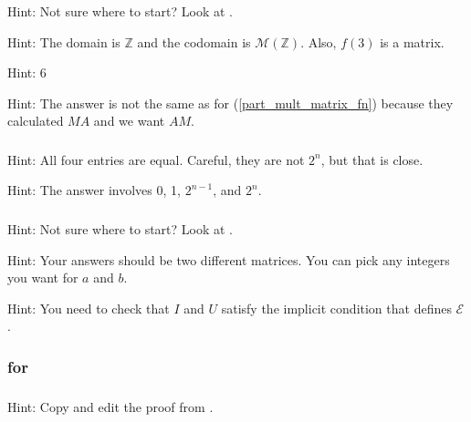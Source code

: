 \subsubsection*{ \answers}
Hint: Not sure where to start? Look at .
\begin{apart}
    \item Hint: The domain is $\mathbb{Z}$ and the codomain is $\mathscr{M}(\mathbb{Z})$.  Also, $f(3)$ is a matrix.
    \item Hint: 6
    \item Hint: The answer is not the same as for  (\ref{part_mult_matrix_fn}) because they calculated $MA$ and we want $AM$.
\end{apart}

\subsubsection*{ \answers}
\begin{apart}
    \item Hint: All four entries are equal.  Careful, they are not $2^n$, but that is close.
    \item Hint: The answer involves 0, 1, $2^{n-1}$, and $2^n$.
\end{apart}

\subsubsection*{ \answers}
Hint: Not sure where to start?  Look at .
\begin{apart}
    \item Hint: Your answers should be two different matrices.  You can pick any integers you want for $a$ and $b$.
    \item Hint: You need to check that $I$ and $U$ satisfy the implicit condition that defines $\mathscr{E}$.
\end{apart}

\subsubsection{\answers for 
\subpffindmatrix}

\subsubsection*{ \answers}
Hint: Copy and edit the proof from .

